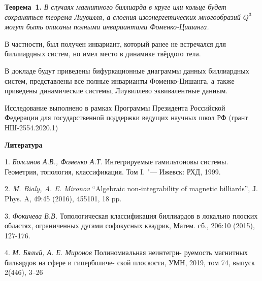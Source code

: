 	\textbf{Теорема~1.} {\it В случаях магнитного биллиарда в круге или кольце будет сохраняться теорема Лиувилля, а слоения изоэнергетических многообразий $Q^3$ могут быть описаны полными инвариантами Фоменко-Цишанга.}

	В частности, был получен инвариант, который ранее не встречался для биллиардных систем, но имел место в динамике твёрдого тела.

	В докладе будут приведены бифуркационные диаграммы данных биллиардных систем, представлены все полные инварианты Фоменко-Цишанга, а также приведены динамические системы, Лиувиллево эквивалентные данным.

	Исследование выполнено в рамках Программы Президента Российской Федерации для государственной поддержки ведущих научных школ РФ (грант НШ-2554.2020.1)

	\smallskip \centerline {\bf Литература} \nopagebreak

	1. {\it Болсинов А.В., Фоменко А.Т.} Интегрируемые гамильтоновы системы. Геометрия, топология, классификация. Том I.
	"--- Ижевск: РХД, 1999.

	2. {\it M. Bialy, A. E. Mironov} “Algebraic non-integrability of magnetic billiards”,
	J. Phys. A, 49:45 (2016), 455101, 18 pp.

	3. {\it Фокичева В.В.} Топологическая классификация биллиардов в локально плоских областях, ограниченных дугами софокусных квадрик, Матем. сб., 206:10 (2015), 127-176.

	4. {\it М. Бялый, А. Е. Миронов} Полиномиальная неинтегри-
	руемость магнитных бильярдов на сфере и гиперболиче-
	ской плоскости, УМН, 2019, том 74, выпуск 2(446), 3–26
